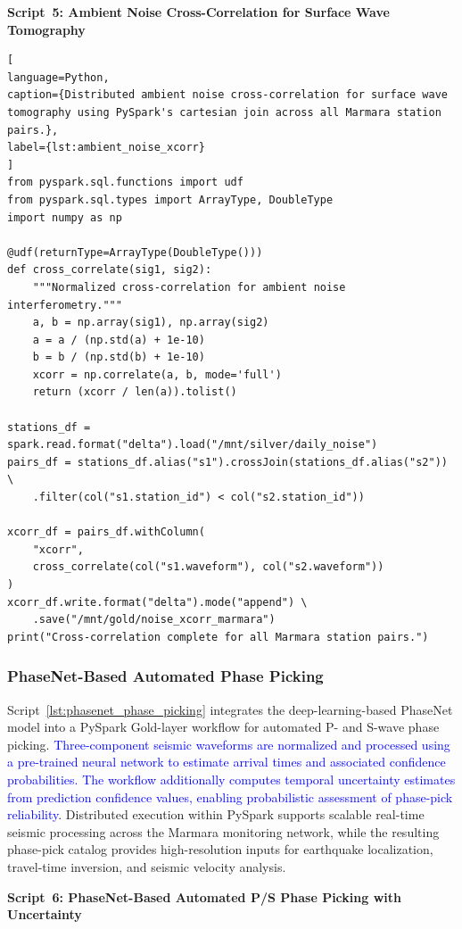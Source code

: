 \documentclass[data,article,submit,pdftex,moreauthors]{Definitions/mdpi}
\begin{document}
\textbf{Script~5: Ambient Noise Cross-Correlation for Surface Wave Tomography}

\begin{lstlisting}[
language=Python,
caption={Distributed ambient noise cross-correlation for surface wave tomography using PySpark's cartesian join across all Marmara station pairs.},
label={lst:ambient_noise_xcorr}
]
from pyspark.sql.functions import udf
from pyspark.sql.types import ArrayType, DoubleType
import numpy as np

@udf(returnType=ArrayType(DoubleType()))
def cross_correlate(sig1, sig2):
    """Normalized cross-correlation for ambient noise interferometry."""
    a, b = np.array(sig1), np.array(sig2)
    a = a / (np.std(a) + 1e-10)
    b = b / (np.std(b) + 1e-10)
    xcorr = np.correlate(a, b, mode='full')
    return (xcorr / len(a)).tolist()

stations_df = spark.read.format("delta").load("/mnt/silver/daily_noise")
pairs_df = stations_df.alias("s1").crossJoin(stations_df.alias("s2")) \
    .filter(col("s1.station_id") < col("s2.station_id"))

xcorr_df = pairs_df.withColumn(
    "xcorr",
    cross_correlate(col("s1.waveform"), col("s2.waveform"))
)
xcorr_df.write.format("delta").mode("append") \
    .save("/mnt/gold/noise_xcorr_marmara")
print("Cross-correlation complete for all Marmara station pairs.")
\end{lstlisting}

\subsubsection{PhaseNet-Based Automated Phase Picking}

Script~\ref{lst:phasenet_phase_picking} integrates the deep-learning-based PhaseNet model into a PySpark Gold-layer workflow for automated P- and S-wave phase picking. \textcolor{blue}{Three-component seismic waveforms are normalized and processed using a pre-trained neural network to estimate arrival times and associated confidence probabilities. The workflow additionally computes temporal uncertainty estimates from prediction confidence values, enabling probabilistic assessment of phase-pick reliability}. Distributed execution within PySpark supports scalable real-time seismic processing across the Marmara monitoring network, while the resulting phase-pick catalog provides high-resolution inputs for earthquake localization, travel-time inversion, and seismic velocity analysis.

\textbf{Script~6: PhaseNet-Based Automated P/S Phase Picking with Uncertainty}
\end{document}
